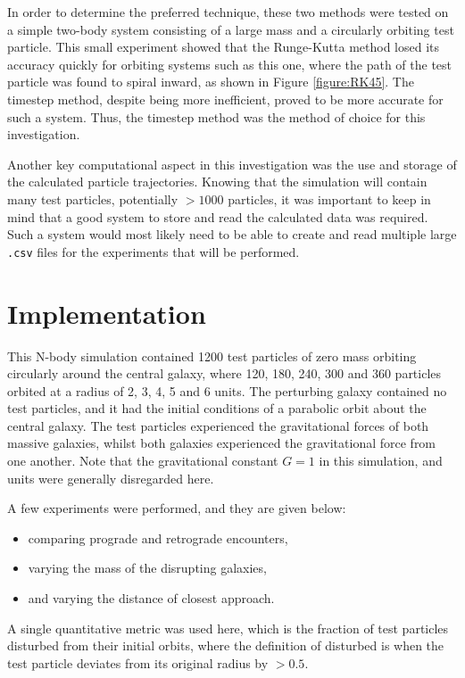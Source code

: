 \documentclass[twoside,twocolumn]{article}
\begin{document}
    In order to determine the preferred technique, these two methods were tested on a simple two-body system consisting of a large mass and a circularly orbiting test particle. This small experiment showed that the Runge-Kutta method losed its accuracy quickly for orbiting systems such as this one, where the path of the test particle was found to spiral inward, as shown in Figure \ref{figure:RK45}. The timestep method, despite being more inefficient, proved to be more accurate for such a system. Thus, the timestep method was the method of choice for this investigation.

    Another key computational aspect in this investigation was the use and storage of the calculated particle trajectories. Knowing that the simulation will contain many test particles, potentially $>1000$ particles, it was important to keep in mind that a good system to store and read the calculated data was required. Such a system would most likely need to be able to create and read multiple large \texttt{.csv} files for the experiments that will be performed.    
    

\section{Implementation}

    This N-body simulation contained 1200 test particles of zero mass orbiting circularly around the central galaxy, where 120, 180, 240, 300 and 360 particles orbited at a radius of 2, 3, 4, 5 and 6 units. The perturbing galaxy contained no test particles, and it had the initial conditions of a parabolic orbit about the central galaxy. The test particles experienced the gravitational forces of both massive galaxies, whilst both galaxies experienced the gravitational force from one another. Note that the gravitational constant $G = 1$ in this simulation, and units were generally disregarded here.

    A few experiments were performed, and they are given below:
    \begin{itemize}
        \item comparing prograde and retrograde encounters,
        \item varying the mass of the disrupting galaxies,
        \item and varying the distance of closest approach.
    \end{itemize}
    A single quantitative metric was used here, which is the fraction of test particles disturbed from their initial orbits, where the definition of disturbed is when the test particle deviates from its original radius by $>0.5$.
\end{document}
